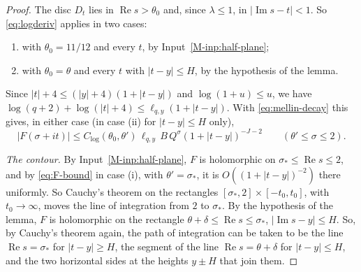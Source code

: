 \documentclass[11pt]{article}
\numberwithin{equation}{section}
\begin{document}
\begin{proof}
The disc $D_t$ lies in $\operatorname{Re} s > \theta_0$ and, since $\lambda \le 1$, in $|\operatorname{Im} s - t| < 1$.
So
\eqref{eq:logderiv} applies in two cases:
\begin{enumerate}
\item[(i)] with $\theta_0 = 11/12$ and every $t$, by Input~\ref{M-inp:half-plane};
\item[(ii)] with $\theta_0 = \theta$ and every $t$ with $|t - y| \le H$, by the hypothesis of the lemma.
\end{enumerate}
Since $|t| + 4 \le (|y| + 4)(1 + |t - y|)$ and $\log(1 + u) \le u$, we have
$\log(q + 2) + \log(|t| + 4) \le \ell_{q, y}(1 + |t - y|)$. With \eqref{eq:mellin-decay} this gives, in either case
(in case (ii) for $|t - y| \le H$ only),
\begin{equation}\label{eq:F-bound}
  |F(\sigma + it)| \le C_{\log}(\theta_0, \theta') \, \ell_{q, y} \, B \, Q^\sigma (1 + |t - y|)^{-J - 2} \qquad
  (\theta'
  \le \sigma \le 2).
\end{equation}

\emph{The contour.} By Input~\ref{M-inp:half-plane}, $F$ is holomorphic on $\sigma_* \le \operatorname{Re} s \le 2$,
and by \eqref{eq:F-bound} in case (i), with $\theta' = \sigma_*$, it is $O((1 + |t - y|)^{-2})$ there uniformly. So
Cauchy's theorem on the rectangles $[\sigma_*, 2] \times [-t_0, t_0]$, with $t_0 \to \infty$, moves the line of
integration from $2$ to $\sigma_*$. By the hypothesis of the lemma, $F$ is holomorphic on the rectangle
$\theta + \delta \le \operatorname{Re} s \le \sigma_*$, $|\operatorname{Im} s - y| \le H$. So, by Cauchy's theorem
again, the path of integration can be taken to be the line $\operatorname{Re} s = \sigma_*$ for $|t - y| \ge H$, the
segment of the line $\operatorname{Re} s = \theta + \delta$ for $|t - y| \le H$, and the two horizontal sides at the
heights $y \pm H$ that join them.


\end{proof}
\end{document}
